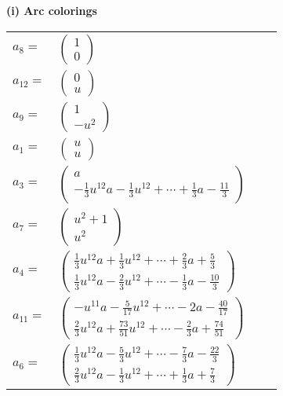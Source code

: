 \documentclass[1p]{elsarticle_modified}
\theoremstyle{definition}
\begin{document}
\flushleft \textbf{(i) Arc colorings}\\
\begin{tabular}{m{7pt} m{180pt} m{7pt} m{180pt} }
\flushright $a_{8}=$&$\begin{pmatrix}1\\0\end{pmatrix}$ \\
\flushright $a_{12}=$&$\begin{pmatrix}0\\u\end{pmatrix}$ \\
\flushright $a_{9}=$&$\begin{pmatrix}1\\- u^2\end{pmatrix}$ \\
\flushright $a_{1}=$&$\begin{pmatrix}u\\u\end{pmatrix}$ \\
\flushright $a_{3}=$&$\begin{pmatrix}a\\-\frac{1}{3} u^{12} a-\frac{1}{3} u^{12}+\cdots+\frac{1}{3} a-\frac{11}{3}\end{pmatrix}$ \\
\flushright $a_{7}=$&$\begin{pmatrix}u^2+1\\u^2\end{pmatrix}$ \\
\flushright $a_{4}=$&$\begin{pmatrix}\frac{1}{3} u^{12} a+\frac{1}{3} u^{12}+\cdots+\frac{2}{3} a+\frac{5}{3}\\\frac{1}{3} u^{12} a-\frac{2}{3} u^{12}+\cdots-\frac{1}{3} a-\frac{10}{3}\end{pmatrix}$ \\
\flushright $a_{11}=$&$\begin{pmatrix}- u^{11} a-\frac{5}{17} u^{12}+\cdots-2 a-\frac{40}{17}\\\frac{2}{3} u^{12} a+\frac{73}{51} u^{12}+\cdots-\frac{2}{3} a+\frac{74}{51}\end{pmatrix}$ \\
\flushright $a_{6}=$&$\begin{pmatrix}\frac{1}{3} u^{12} a-\frac{5}{3} u^{12}+\cdots-\frac{7}{3} a-\frac{22}{3}\\\frac{2}{3} u^{12} a-\frac{1}{3} u^{12}+\cdots+\frac{1}{3} a+\frac{7}{3}\end{pmatrix}$ \\

\end{tabular}
\end{document}
